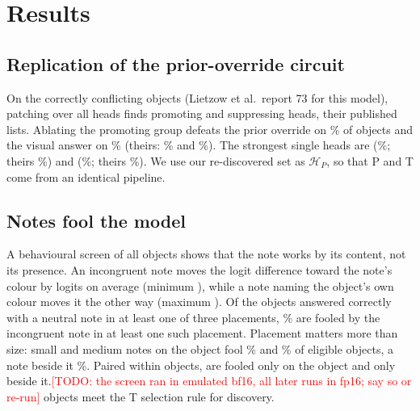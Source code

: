 \documentclass[10pt,twocolumn,letterpaper]{article}
\newcommand{\todo}[1]{\textcolor{red}{[TODO: #1]}}
\newcommand{\HP}{\mathcal{H}_P}
\begin{document}
\section{Results}

\subsection{Replication of the prior-override circuit}\label{sec:replication}
On the \nP{} correctly conflicting objects (Lietzow et al.\ report 73 for this
model), patching over all \nHeads{} heads finds \nPromP{} promoting and \nSupP{}
suppressing heads, \promMatchesLietzow{} their published lists. Ablating the
promoting group defeats the prior override on \repPriorFlip\% of objects and the
visual answer on \repVisualFlip\% (theirs: \lietzowPriorFlip\% and
\lietzowVisualFlip\%). The strongest single heads are \topSingleOne{}
(\topSingleOneFlip\%; theirs \topSingleOneLietzow\%) and \topSingleTwo{}
(\topSingleTwoFlip\%; theirs \topSingleTwoLietzow\%). We use our re-discovered set
as $\HP$, so that P and T come from an identical pipeline.

\subsection{Notes fool the model}
A behavioural screen of all \nObjects{} objects shows that the note works by its
content, not its presence. An incongruent note moves the logit difference toward
the note's colour by \attackShift{} logits on average (minimum \attackShiftMin),
while a note naming the object's own colour moves it \congruentShift{} the other
way (maximum \congruentShiftMax). Of the \nCorrectNeutral{} objects answered
correctly with a neutral note in at least one of three placements,
\screenFoolRate\% are fooled by the incongruent note in at least one such
placement. Placement matters more than size: small and medium notes on the
object fool \screenFoolSmall\% and \screenFoolMedium\% of eligible objects, a note
beside it \screenFoolBeside\%. Paired within objects, \pairedOnOnly{} are fooled
only on the object and \pairedBesideOnly{} only beside it.\todo{the screen ran in
emulated bf16, all later runs in fp16; say so or re-run} \nT{} objects meet the T
selection rule for discovery.
\end{document}
